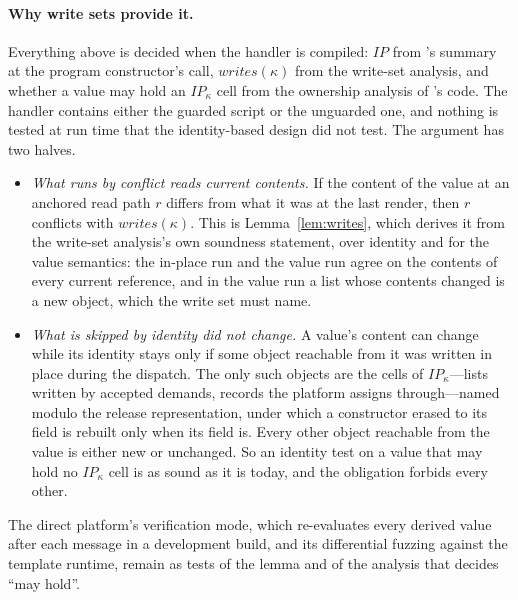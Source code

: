 \paragraph{Why write sets provide it.} Everything above is decided when the handler is compiled:
$\mathit{IP}$ from 's summary at the program constructor's call, $\mathit{writes}(\kappa)$ from
the write-set analysis, and whether a value may hold an $\mathit{IP}_\kappa$ cell from the ownership
analysis of 's code. The handler contains either the guarded script or the unguarded one, and
nothing is tested at run time that the identity-based design did not test. The argument has two halves.
\begin{itemize}
\item \emph{What runs by conflict reads current contents.} If the content of the value at an anchored read
path $r$ differs from what it was at the last render, then $r$ conflicts with $\mathit{writes}(\kappa)$.
This is Lemma~\ref{lem:writes}, which derives it from the write-set analysis's own soundness statement,
over identity and for the value semantics: the in-place run and the value run agree on the contents of
every current reference, and in the value run a list whose contents changed is a new object, which the
write set must name.
\item \emph{What is skipped by identity did not change.} A value's content can change while its identity
stays only if some object reachable from it was written in place during the dispatch. The only such
objects are the cells of $\mathit{IP}_\kappa$---lists written by accepted demands, records the platform
assigns through---named modulo the release representation, under which a constructor erased to its field
is rebuilt only when its field is. Every other object reachable from the value is either new or unchanged.
So an identity test on a value that may hold no $\mathit{IP}_\kappa$ cell is as sound as it is today, and the
obligation forbids every other.
\end{itemize}
The direct platform's verification mode, which re-evaluates every derived value after each message in a
development build, and its differential fuzzing against the template runtime, remain as tests of the
lemma and of the analysis that decides ``may hold''.

